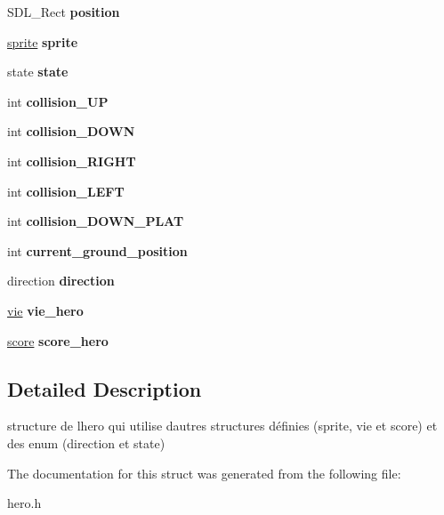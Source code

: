 \begin{DoxyCompactItemize}
\item 
\mbox{\label{structHero_abc9595e897232ee4cf912e0e2c36bf28}} 
S\+D\+L\+\_\+\+Rect {\bfseries position}
\item 
\mbox{\label{structHero_a1f280d48754ed952298adf26a5f10c16}} 
\hyperlink{structSprite}{sprite} {\bfseries sprite}
\item 
\mbox{\label{structHero_af2abe9c576d42b2dffb36f2dc332d680}} 
state {\bfseries state}
\item 
\mbox{\label{structHero_aa111c732e587bf2bee3f58c4e3c7dba3}} 
int {\bfseries collision\+\_\+\+UP}
\item 
\mbox{\label{structHero_ab77a2aee8cecfbe25f95542179cfba65}} 
int {\bfseries collision\+\_\+\+D\+O\+WN}
\item 
\mbox{\label{structHero_af8d0fe553ca11082004c8fdab84780e4}} 
int {\bfseries collision\+\_\+\+R\+I\+G\+HT}
\item 
\mbox{\label{structHero_af7f5cea2cc6cc1a0a71c6406f5cb7eb0}} 
int {\bfseries collision\+\_\+\+L\+E\+FT}
\item 
\mbox{\label{structHero_ad0cda8d82f4351c33ac99403fad1ca52}} 
int {\bfseries collision\+\_\+\+D\+O\+W\+N\+\_\+\+P\+L\+AT}
\item 
\mbox{\label{structHero_a058a4906f1625db7ce2c1abcc4eca639}} 
int {\bfseries current\+\_\+ground\+\_\+position}
\item 
\mbox{\label{structHero_ac32ab152105eb5cda88226f29ee03daf}} 
direction {\bfseries direction}
\item 
\mbox{\label{structHero_ab523a8e24b06bab0cbc17cd744f772aa}} 
\hyperlink{structVie}{vie} {\bfseries vie\+\_\+hero}
\item 
\mbox{\label{structHero_af3b8a739baa871df683f7ce374fae8d3}} 
\hyperlink{structScore}{score} {\bfseries score\+\_\+hero}
\end{DoxyCompactItemize}


\subsection{Detailed Description}
structure de l\textquotesingle{}hero qui utilise d\textquotesingle{}autres structures définies (sprite, vie et score) et des enum (direction et state) 

The documentation for this struct was generated from the following file\+:\begin{DoxyCompactItemize}
\item 
hero.\+h\end{DoxyCompactItemize}

